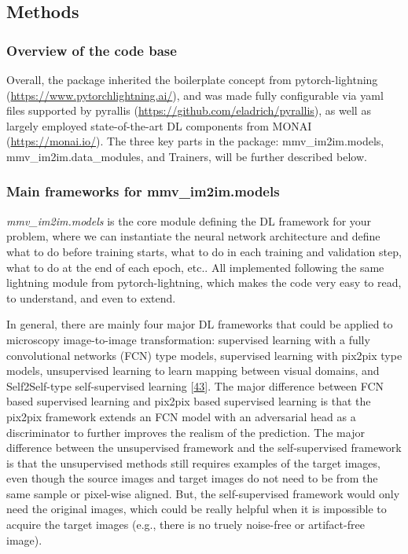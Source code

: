 \hypertarget{methods}{%
\subsection{Methods}\label{methods}}

\hypertarget{overview-of-the-code-base}{%
\subsubsection{Overview of the code base}\label{overview-of-the-code-base}}

Overall, the package inherited the boilerplate concept from pytorch-lightning (\url{https://www.pytorchlightning.ai/}), and was made fully configurable via yaml files supported by pyrallis (\url{https://github.com/eladrich/pyrallis}), as well as largely employed state-of-the-art DL components from MONAI (\url{https://monai.io/}). The three key parts in the package: mmv\_im2im.models, mmv\_im2im.data\_modules, and Trainers, will be further described below.

\hypertarget{main-frameworks-for-mmv_im2im.models}{%
\subsubsection{Main frameworks for mmv\_im2im.models}\label{main-frameworks-for-mmv_im2im.models}}

\emph{mmv\_im2im.models} is the core module defining the DL framework for your problem, where we can instantiate the neural network architecture and define what to do before training starts, what to do in each training and validation step, what to do at the end of each epoch, etc.. All implemented following the same lightning module from pytorch-lightning, which makes the code very easy to read, to understand, and even to extend.

In general, there are mainly four major DL frameworks that could be applied to microscopy image-to-image transformation: supervised learning with a fully convolutional networks (FCN) type models, supervised learning with pix2pix type models, unsupervised learning to learn mapping between visual domains, and Self2Self-type self-supervised learning {[}\protect\hyperlink{ref-tuObtXMR}{43}{]}. The major difference between FCN based supervised learning and pix2pix based supervised learning is that the pix2pix framework extends an FCN model with an adversarial head as a discriminator to further improves the realism of the prediction. The major difference between the unsupervised framework and the self-supervised framework is that the unsupervised methods still requires examples of the target images, even though the source images and target images do not need to be from the same sample or pixel-wise aligned. But, the self-supervised framework would only need the original images, which could be really helpful when it is impossible to acquire the target images (e.g., there is no truely noise-free or artifact-free image).

